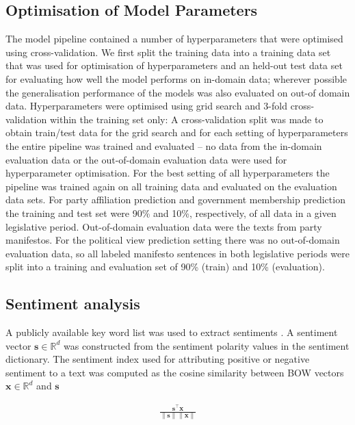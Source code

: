 \documentclass{article}
\renewcommand{\vec}[1]{\mathbf{#1}}
\newcommand{\R}{\mathds{R}}
\begin{document}
\subsection{Optimisation of Model Parameters}\label{sec:crossvalidation}
The model pipeline contained a number of  hyperparameters that were optimised using cross-validation.  
We first split the training data into a training data set that was used for optimisation of hyperparameters and an held-out test data set for evaluating how well the model performs on in-domain data; wherever possible the generalisation performance of the models was also evaluated on out-of domain data. Hyperparameters were optimised using grid search and 3-fold cross-validation within the training set only: A cross-validation split was made to obtain train/test data for the grid search and for each setting of hyperparameters the entire pipeline was trained and evaluated -- no data from the in-domain evaluation data or the out-of-domain evaluation data were used for hyperparameter optimisation. For the best setting of all hyperparameters the pipeline was trained again on all training data and evaluated on the evaluation data sets. For party affiliation prediction and government membership prediction the training and test set were 90\% and 10\%, respectively, of all data in a given legislative period. Out-of-domain evaluation data were the texts from party manifestos. For the political view prediction setting there was no out-of-domain evaluation data, so all labeled manifesto sentences in both legislative periods were split into a training and evaluation set of 90\% (train) and 10\% (evaluation). 

\subsection{Sentiment analysis}\label{sec:sentiment_analysis_methods}
A publicly available key word list was used to extract sentiments \cite{remquahey2010}. A sentiment vector $\vec{s}\in\R^d$ was constructed from the sentiment polarity values in the sentiment dictionary. The sentiment index used for attributing positive or negative sentiment to a text was computed as the cosine similarity between BOW vectors $\vec{x}\in\R^d$ and $\vec{s}$

\begin{align}
\frac{\vec{s}^\top \vec{x}}{\|\vec{s}\|\|\vec{x}\|}
\end{align}
\end{document}
